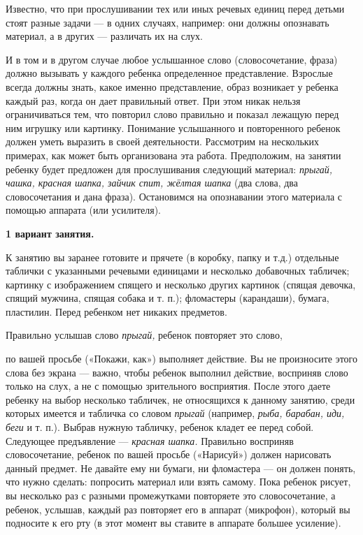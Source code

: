 \documentclass{book}
\renewcommand{\emph}[1]{\textit{#1}}
\begin{document}
Известно, что при прослушивании тех или иных речевых единиц перед детьми
стоят разные задачи --- в одних случаях, например: они должны опознавать
материал, а в других --- различать их на слух.

И в том и в другом случае любое услышанное слово (словосочетание, фраза)
должно вызывать у каждого ребенка определенное представление. Взрослые
всегда должны знать, какое именно представление, образ возникает у
ребенка каждый раз, когда он дает правильный ответ. При этом никак
нельзя ограничиваться тем, что повторил слово правильно и показал
лежащую перед ним игрушку или картинку. Понимание услышанного и
повторенного ребенок должен уметь выразить в своей деятельности.
Рассмотрим на нескольких примерах, как может быть организована эта
работа. Предположим, на занятии ребенку будет предложен для
прослушивания следующий материал: \emph{прыгай, чашка, красная шапка,
зайчик спит, жёлтая шапка} (два слова, два словосочетания и дана фраза).
Остановимся на опознавании этого материала с помощью аппарата (или
усилителя).

\textbf{1 вариант занятия.}

К занятию вы заранее готовите и прячете (в коробку, папку и т.д.)
отдельные таблички с указанными речевыми единицами и несколько
добавочных табличек; картинку с изображением спящего и несколько других
картинок (спящая девочка, спящий мужчина, спящая собака и т. п.);
фломастеры (карандаши), бумага, пластилин. Перед ребенком нет никаких
предметов.

Правильно услышав слово \emph{прыгай,} ребенок повторяет это слово,

по вашей просьбе («Покажи, как») выполняет действие. Вы не произносите
этого слова без экрана --- важно, чтобы ребенок выполнил действие,
восприняв слово только на слух, а не с помощью зрительного восприятия.
После этого даете ребенку на выбор несколько табличек, не относящихся к
данному занятию, среди которых имеется и табличка со словом
\emph{прыгай} (например, \emph{рыба, барабан, иди, беги} и т. п.).
Выбрав нужную табличку, ребенок кладет ее перед собой. Следующее
предъявление --- \emph{красная шапка.} Правильно восприняв
словосочетание, ребенок по вашей просьбе («Нарисуй») должен нарисовать
данный предмет. Не давайте ему ни бумаги, ни фломастера --- он должен
понять, что нужно сделать: попросить материал или взять самому. Пока
ребенок рисует, вы несколько раз с разными промежутками повторяете это
словосочетание, а ребенок, услышав, каждый раз повторяет его в аппарат
(микрофон), который вы подносите к его рту (в этот момент вы ставите в
аппарате большее усиление).
\end{document}
